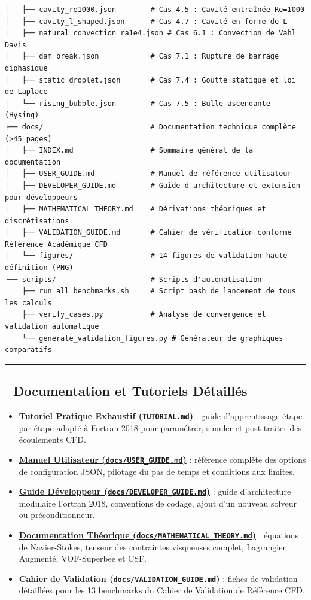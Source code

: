 \documentclass[
  french,
]{article}
\providecommand{\tightlist}{%
  \setlength{\itemsep}{0pt}\setlength{\parskip}{0pt}}
\begin{document}
\begin{verbatim}
│   ├── cavity_re1000.json        # Cas 4.5 : Cavité entraînée Re=1000
│   ├── cavity_l_shaped.json      # Cas 4.7 : Cavité en forme de L
│   ├── natural_convection_ra1e4.json # Cas 6.1 : Convection de Vahl Davis
│   ├── dam_break.json            # Cas 7.1 : Rupture de barrage diphasique
│   ├── static_droplet.json       # Cas 7.4 : Goutte statique et loi de Laplace
│   └── rising_bubble.json        # Cas 7.5 : Bulle ascendante (Hysing)
├── docs/                         # Documentation technique complète (>45 pages)
│   ├── INDEX.md                  # Sommaire général de la documentation
│   ├── USER_GUIDE.md             # Manuel de référence utilisateur
│   ├── DEVELOPER_GUIDE.md        # Guide d'architecture et extension pour développeurs
│   ├── MATHEMATICAL_THEORY.md    # Dérivations théoriques et discrétisations
│   ├── VALIDATION_GUIDE.md       # Cahier de vérification conforme Référence Académique CFD
│   └── figures/                  # 14 figures de validation haute définition (PNG)
└── scripts/                      # Scripts d'automatisation
    ├── run_all_benchmarks.sh     # Script bash de lancement de tous les calculs
    ├── verify_cases.py           # Analyse de convergence et validation automatique
    └── generate_validation_figures.py # Générateur de graphiques comparatifs
\end{verbatim}

\begin{center}\rule{0.5\linewidth}{0.5pt}\end{center}

\subsection{📖 Documentation et Tutoriels
Détaillés}\label{documentation-et-tutoriels-duxe9tailluxe9s}

\begin{itemize}
\tightlist
\item
  \href{TUTORIAL.md}{\textbf{Tutoriel Pratique Exhaustif
  (\texttt{TUTORIAL.md})}} : guide d'apprentissage étape par étape
  adapté à Fortran 2018 pour paramétrer, simuler et post-traiter des
  écoulements CFD.
\item
  \href{docs/USER_GUIDE.md}{\textbf{Manuel Utilisateur
  (\texttt{docs/USER\_GUIDE.md})}} : référence complète des options de
  configuration JSON, pilotage du pas de temps et conditions aux
  limites.
\item
  \href{docs/DEVELOPER_GUIDE.md}{\textbf{Guide Développeur
  (\texttt{docs/DEVELOPER\_GUIDE.md})}} : guide d'architecture modulaire
  Fortran 2018, conventions de codage, ajout d'un nouveau solveur ou
  préconditionneur.
\item
  \href{docs/MATHEMATICAL_THEORY.md}{\textbf{Documentation Théorique
  (\texttt{docs/MATHEMATICAL\_THEORY.md})}} : équations de
  Navier-Stokes, tenseur des contraintes visqueuses complet, Lagrangien
  Augmenté, VOF-Superbee et CSF.
\item
  \href{docs/VALIDATION_GUIDE.md}{\textbf{Cahier de Validation
  (\texttt{docs/VALIDATION\_GUIDE.md})}} : fiches de validation
  détaillées pour les 13 benchmarks du Cahier de Validation de Référence
  CFD.
\end{itemize}
\end{document}
